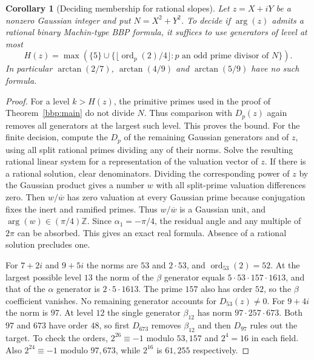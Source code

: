 \documentclass[11pt]{article}
\newtheorem{corollary}[theorem]{Corollary}
\begin{document}
\begin{corollary}[Deciding membership for rational slopes]\label{bbp:decide}
Let $z=X+iY$ be a nonzero Gaussian integer and put $N=X^2+Y^2$.
To decide if $\arg(z)$ admits a rational binary Machin-type BBP
formula, it suffices to use generators of level at most
\[
 H(z)=\max\left(\{5\}\cup
  \{\lfloor\operatorname{ord}_p(2)/4\rfloor:
                            p\text{ an odd prime divisor of }N\}\right).
\]
In particular $\arctan(2/7)$, $\arctan(4/9)$ and $\arctan(5/9)$
have no such formula.
\end{corollary}
\begin{proof}
For a level $k>H(z)$, the primitive primes used in
the proof of Theorem~\ref{bbp:main} do not divide $N$.
Thus comparison with $D_p(z)$ again removes all generators at the
largest such level. This proves the bound. For the finite decision,
compute the $D_p$ of the remaining Gaussian generators and of $z$,
using all split rational primes dividing any of their norms. Solve
the resulting rational linear system for a representation of the
valuation vector of $z$. If there is a rational solution, clear
denominators. Dividing the corresponding power of $z$ by the Gaussian
product gives a number $w$ with all split-prime valuation
differences zero. Then $w/\overline w$ has zero valuation at every
Gaussian prime because conjugation fixes the inert and ramified primes.
Thus $w/\overline w$ is a Gaussian unit, and
$\arg(w)\in(\pi/4)\mathbb Z$. Since $\alpha_1=-\pi/4$, the residual
angle and any multiple of $2\pi$ can be absorbed. This gives an exact
real formula. Absence of a rational solution precludes one.

For $7+2i$ and $9+5i$ the norms are $53$ and $2\cdot53$,
and $\operatorname{ord}_{53}(2)=52$. At the largest possible level
$13$ the norm of the $\beta$ generator equals
$5\cdot53\cdot157\cdot1613$, and that of the $\alpha$ generator is
$2\cdot 5\cdot1613$. The prime $157$ also has order $52$, so the
$\beta$ coefficient vanishes. No remaining generator accounts for
$D_{53}(z)\ne0$. For $9+4i$ the norm is $97$. At level $12$ the
single generator $\beta_{12}$ has norm $97\cdot257\cdot673$.
Both $97$ and $673$ have order $48$, so first $D_{673}$ removes
$\beta_{12}$ and then $D_{97}$ rules out the target. To check the orders,
$2^{26}\equiv-1$ modulo $53,157$ and $2^4=16$ in each field.
Also $2^{24}\equiv-1$ modulo $97,673$, while $2^{16}$ is $61,255$
respectively.
\end{proof}
\end{document}
